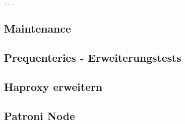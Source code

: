 \begin{flushleft}
\begin{lstlisting}[language=yaml, caption=Testsystem - Deployment - main.yml,captionpos=b,label={lst:testsystem-deployment-main.yml},breaklines=true]
...

    \end{lstlisting}
    \subsection{Maintenance}
    \subsection{Prequenteries - Erweiterungstests}
    \subsection{Haproxy erweitern}
    \subsection{Patroni Node}
\end{flushleft}